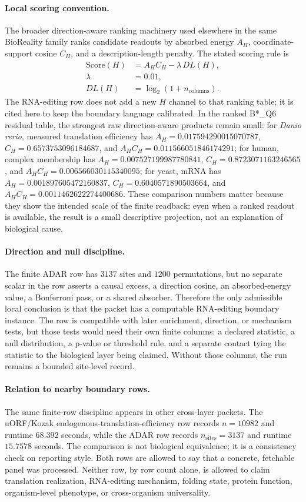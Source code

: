 \paragraph{Local scoring convention.}
The broader direction-aware ranking machinery used elsewhere in the same BioReality family ranks candidate readouts by absorbed energy $A_H$, coordinate-support cosine $C_H$, and a description-length penalty.  The stated scoring rule is
$$
\begin{aligned}
\mathrm{Score}(H) &= A_H C_H - \lambda\,DL(H),\\
\lambda &= 0.01,\\
DL(H) &= \log_2(1+n_{\mathrm{columns}}).
\end{aligned}
$$
The RNA-editing row does not add a new $H$ channel to that ranking table; it is cited here to keep the boundary language calibrated.  In the ranked B*\_Q6 residual table, the strongest raw direction-aware products remain small: for \textit{Danio rerio}, measured translation efficiency has $A_H=0.017594290015070787$, $C_H=0.6573753096184687$, and $A_HC_H=0.011566051846174291$; for human, complex membership has $A_H=0.007527199987780841$, $C_H=0.8723071163246565$, and $A_HC_H=0.006566030115340095$; for yeast, mRNA has $A_H=0.001897605472160837$, $C_H=0.6040571890503664$, and $A_HC_H=0.0011462622274400686$.  These comparison numbers matter because they show the intended scale of the finite readback: even when a ranked readout is available, the result is a small descriptive projection, not an explanation of biological cause.

\paragraph{Direction and null discipline.}
The finite ADAR row has $3137$ sites and $1200$ permutations, but no separate scalar in the row asserts a causal excess, a direction cosine, an absorbed-energy value, a Bonferroni pass, or a shared absorber.  Therefore the only admissible local conclusion is that the packet has a computable RNA-editing boundary instance.  The row is compatible with later enrichment, direction, or mechanism tests, but those tests would need their own finite columns: a declared statistic, a null distribution, a p-value or threshold rule, and a separate contact tying the statistic to the biological layer being claimed.  Without those columns, the run remains a bounded site-level record.

\paragraph{Relation to nearby boundary rows.}
The same finite-row discipline appears in other cross-layer packets.  The uORF/Kozak endogenous-translation-efficiency row records $n=10982$ and runtime $68.392$ seconds, while the ADAR row records $n_{\mathrm{sites}}=3137$ and runtime $15.7578$ seconds.  The comparison is not biological equivalence; it is a consistency check on reporting style.  Both rows are allowed to say that a concrete, fetchable panel was processed.  Neither row, by row count alone, is allowed to claim translation realization, RNA-editing mechanism, folding state, protein function, organism-level phenotype, or cross-organism universality.

